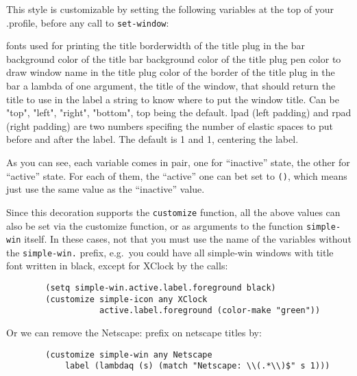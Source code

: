 This style is customizable by setting the following variables at the top
of your .profile, before any call to \verb"set-window":

\begin{description}
fonts used for printing the title
borderwidth of the title plug in the bar
background color of the title bar
background color of the title plug
pen color to draw window name in the title plug
color of the border of the title plug in the bar
a lambda of one argument, the title of the window, that should return the
title to use in the label
 a string to know where to put the window title. Can
be "top", "left", "right", "bottom", top being the default.
lpad (left padding) and rpad (right padding) are two numbers specifing the
number of elastic spaces to put before and after the label. The default is 1
and 1, centering the label.
\end{description}

As you can see, each variable comes in pair, one for ``inactive'' state, the
other for ``active'' state. For each of them, the ``active'' one can bet set
to \verb|()|, which means just use the same value as the ``inactive'' value.

Since this decoration supports the \verb|customize| function, all the above
values can also be set via the customize function, or as arguments to the
function \verb|simple-win| itself. In these cases, not that you must use the
name of the variables without the \verb|simple-win.| prefix, e.g.\ you could
have all simple-win windows with title font written in black, except for
XClock by the calls:

{\exemplefont\begin{verbatim}
        (setq simple-win.active.label.foreground black)
        (customize simple-icon any XClock
                   active.label.foreground (color-make "green"))
\end{verbatim}}

Or we can remove the Netscape: prefix on netscape titles by:
{\exemplefont\begin{verbatim}
        (customize simple-win any Netscape
            label (lambdaq (s) (match "Netscape: \\(.*\\)$" s 1)))
\end{verbatim}}

